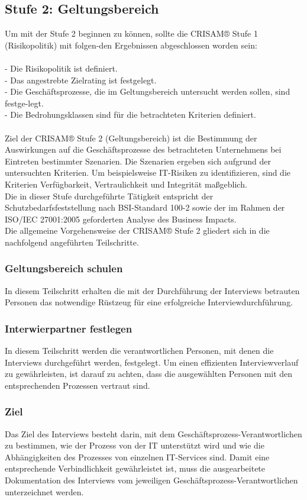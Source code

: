 \subsection {Stufe 2: Geltungsbereich}
Um mit der Stufe 2 beginnen zu können, sollte die CRISAM® Stufe 1 (Risikopolitik) mit folgen-den Ergebnissen abgeschlossen worden sein:\\
\\- Die Risikopolitik ist definiert.
\\- Das angestrebte Zielrating ist festgelegt.
\\- Die Geschäftsprozesse, die im Geltungsbereich untersucht werden sollen, sind festge-legt.
\\- Die Bedrohungsklassen sind für die betrachteten Kriterien definiert.\\
\\
Ziel der CRISAM® Stufe 2 (Geltungsbereich) ist die Bestimmung der Auswirkungen auf die Geschäftsprozesse des betrachteten Unternehmens bei Eintreten bestimmter Szenarien. Die Szenarien ergeben sich aufgrund der untersuchten Kriterien. Um beispielsweise IT-Risiken zu identifizieren, sind die Kriterien Verfügbarkeit, Vertraulichkeit und Integrität maßgeblich.\\
Die in dieser Stufe durchgeführte Tätigkeit entspricht der Schutzbedarfsfeststellung nach BSI-Standard 100-2 sowie der im Rahmen der ISO/IEC 27001:2005 geforderten Analyse des Business Impacts.\\
Die allgemeine Vorgehensweise der CRISAM® Stufe 2 gliedert sich in die nachfolgend angeführten Teilschritte.
\subsubsection{Geltungsbereich schulen}
In diesem Teilschritt erhalten die mit der Durchführung der Interviews betrauten Personen das notwendige Rüstzeug für eine erfolgreiche Interviewdurchführung.
\subsubsection{Interwierpartner festlegen}
In diesem Teilschritt werden die verantwortlichen Personen, mit denen die Interviews durchgeführt werden, festgelegt. Um einen effizienten Interviewverlauf zu gewährleisten, ist darauf zu achten, dass die ausgewählten Personen mit den entsprechenden Prozessen vertraut sind.
\subsubsection{Ziel}
Das Ziel des Interviews besteht darin, mit dem Geschäftsprozess-Verantwortlichen zu bestimmen, wie der Prozess von der IT unterstützt wird und wie die Abhängigkeiten des Prozesses von einzelnen IT-Services sind. Damit eine entsprechende Verbindlichkeit gewährleistet ist, muss die ausgearbeitete Dokumentation des Interviews vom jeweiligen Geschäftsprozess-Verantwortlichen unterzeichnet werden.

